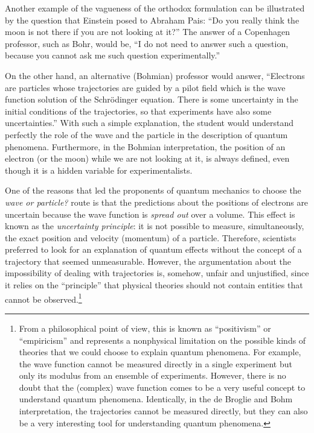 \documentclass[onecolumn,nofootinbib, secnumarabic, amsmath, nobibnotes,11pt,aps,pra]{revtex4-1}
\begin{document}
Another example of the vagueness of the orthodox formulation can be illustrated by the question that Einstein posed to Abraham Pais: ``Do you really think the moon is not there if you are not looking at it?'' The answer of a Copenhagen professor, such as Bohr, would be, ``I do not need to answer such a question, because you cannot ask me such question experimentally.''

On the other hand, an alternative (Bohmian) professor would answer,
``Electrons are particles whose trajectories are guided by a pilot
field which is  the wave function solution of the Schr\"odinger
equation. There is some uncertainty in the initial conditions of the
trajectories, so that experiments have also some uncertainties.''
With such a simple explanation, the student would understand
perfectly the role of the wave and the particle in the description
of quantum phenomena. Furthermore, in the Bohmian interpretation,
the position of an electron (or the moon) while we are not looking
at it, is always defined, even though it is a hidden variable  for experimentalists.

One of the reasons that led the proponents of quantum mechanics to
choose the \textit{wave or particle?} route is that the predictions
about the positions of electrons are uncertain because the wave
function is \textit{spread out} over a volume. This effect is known
as the \textit{uncertainty principle}: it is not possible to
measure, simultaneously, the exact position and velocity (momentum)
of a particle. Therefore, scientists preferred to look for an
explanation of quantum effects without the concept of a trajectory
that seemed unmeasurable. However, the argumentation about the
impossibility of dealing with trajectories is, somehow, unfair and
unjustified, since it relies on the ``principle'' that physical
theories should not contain entities that cannot be
observed.\footnote{From a philosophical point of view, this is known
as ``positivism'' or ``empiricism'' and represents a nonphysical
limitation on the possible kinds of theories that we could choose to
explain quantum phenomena. For example, the wave function cannot be
measured directly in a single experiment but only its modulus from
an ensemble of experiments. However, there is no doubt that the
(complex) wave function comes to be a very useful
concept to understand quantum phenomena. Identically, in the de
Broglie and Bohm interpretation, the trajectories cannot be measured
directly, but they can also be a very interesting tool for
understanding quantum phenomena.}
\end{document}
